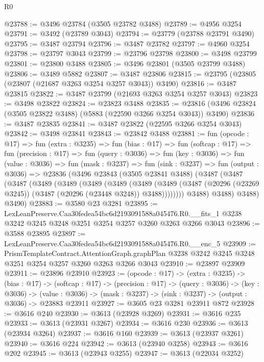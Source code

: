 \begin{lexlean}{R0}
\begin{coremodule}
@23788 := @3496 @23784 (@3505 @23782 @3488)
@23789 := @4956 @3254
@23791 := @3492 (@23789 @3043)
@23794 := @23779 (@23788 @23791 @3490)
@23795 := @3487 @23794
@23796 := @3487 @23782
@23797 := @4960 @3254
@23798 := @23797 @3043
@23799 := @23796 @23798
@23800 := @3498 @23799
@23801 := @23800 @3488
@23805 := @3496 @23801 (@3505 @23799 @3488)
@23806 := @3489 @5882
@23807 := @3487 @23806
@23815 := @23795 (@23805 (@23807 (@21687 @3263 @3254 @3257 @3043)) @3490)
@23816 := @3487 @23815
@23822 := @3487 @23799 (@21693 @3263 @3254 @3257 @3043)
@23823 := @3498 @23822
@23824 := @23823 @3488
@23835 := @23816 (@3496 @23824 (@3505 @23822 @3488) (@5883 (@22590 @3266 @3254 @3043)) @3490)
@23836 := @3487 @23835
@23841 := @3487 @23822 (@22595 @3266 @3254 @3043)
@23842 := @3498 @23841
@23843 := @23842 @3488
@23881 := fun (opcode : @17) =>
  fun (extra : @3235) =>
  fun (bias : @17) =>
  fun (softcap : @17) =>
  fun (precision : @17) =>
  fun (query : @3036) =>
  fun (key : @3036) =>
  fun (value : @3036) =>
  fun (mask : @3237) =>
  fun (sink : @3237) =>
  fun (output : @3036) =>
  @23836
    (@3496
      @23843
      (@3505 @23841 @3488)
      (@3487
        (@3487
          (@3487
            (@3489
              (@3489
                (@3489
                  (@3489
                    (@3489
                      (@3489
                        (@3487 (@20296 (@23269 @3245)) (@3487 (@20296 (@23448 @3248)) @3488))))))))
            @3488)
          @3488)
        @3488)
      @3490)
@23883 := @3580 @23 @3281
@23895 := LexLeanPreserve.Caa30fedea54bc6d2193091588a045476.R0.__fits_1
    @3238
    @3242
    @3245
    @3248
    @3251
    @3254
    @3257
    @3260
    @3263
    @3266
    @3043
@23896 := @3588 @23895
@23897 := LexLeanPreserve.Caa30fedea54bc6d2193091588a045476.R0.__enc_5
@23909 := PrismTemplateContract.AttentionGraph.graphPlan
    @3238
    @3242
    @3245
    @3248
    @3251
    @3254
    @3257
    @3260
    @3263
    @3266
    @3043
@23910 := @23897 @23909
@23911 := @23896 @23910
@23923 := (opcode : @17) ->
  (extra : @3235) ->
  (bias : @17) ->
  (softcap : @17) ->
  (precision : @17) ->
  (query : @3036) ->
  (key : @3036) ->
  (value : @3036) -> (mask : @3237) -> (sink : @3237) -> (output : @3036) -> @23883 @23911
@23927 := @3605 @23 @3281 @23911 @872
@23928 := @3616 @240
@23930 := @3613 (@23928 @3269)
@23931 := @3616 @235
@23933 := @3613 (@23931 @3267)
@23934 := @3616 @230
@23936 := @3613 (@23934 @3264)
@23937 := @3616 @160
@23939 := @3613 (@23937 @3261)
@23940 := @3616 @224
@23942 := @3613 (@23940 @3258)
@23943 := @3616 @202
@23945 := @3613 (@23943 @3255)
@23947 := @3613 (@22034 @3252)

\end{coremodule}
\end{lexlean}
